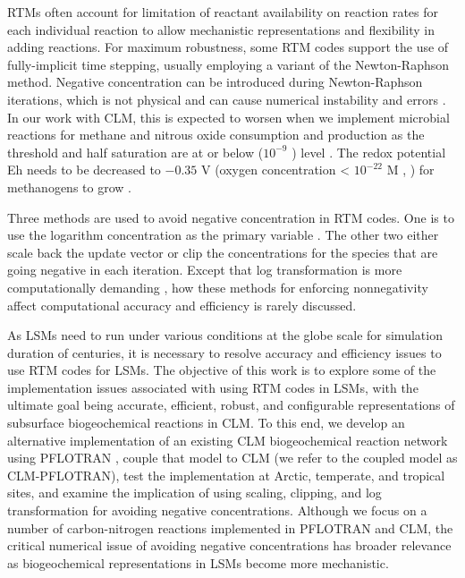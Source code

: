 \documentclass[gmd, manuscript]{copernicus}
\begin{document}
RTMs often account for limitation of reactant availability on reaction rates
for each individual reaction to allow mechanistic representations and flexibility in
adding reactions. 
For maximum robustness, some RTM codes support the use of fully-implicit time stepping, usually employing a variant of the Newton-Raphson method. 
Negative concentration can be introduced during
Newton-Raphson iterations, which is not physical and can cause numerical instability and
errors \citep{Shampine2005}. 
In our work with CLM, this is expected to worsen when we implement
microbial reactions for methane and nitrous oxide consumption and production as
the threshold and half saturation are at or below  ($10^{-9}$
) level \citep{Conrad1996}. The redox potential Eh needs to be
decreased to $-0.35$ \unit{V} (oxygen concentration < $10^{-22}$ \unit{M}
\citeauthor{Hungate1975}, \citeyear{Hungate1975}) for methanogens to grow
\citep{Jarrell1985}. 

Three methods are used to avoid negative concentration in RTM codes. One is to
use the logarithm concentration as the primary variable
\citep{Bethke2007,Hammond2003,Parkhurst1999}. The other two either scale back
the update vector \citep{Bethke2007,Hammond2003} or clip the concentrations for
the species that are going negative \citep{Yeh2004,White2005,Xu2014} in each
iteration. Except that log transformation is more computationally demanding
\citep{Hammond2003}, how these methods for enforcing nonnegativity affect
computational accuracy and efficiency is rarely discussed. 

As LSMs need to run under various conditions at the globe scale for simulation
duration of centuries, it is necessary to resolve accuracy and efficiency
issues to use RTM codes for LSMs. The objective of this work is to explore some
of the implementation issues associated with using RTM codes in LSMs, with the
ultimate goal being accurate, efficient, robust, and configurable
representations of subsurface biogeochemical reactions in CLM. To this end, we
develop an alternative implementation of an existing CLM biogeochemical
reaction network using PFLOTRAN \citep{Lichtner2015,Hammond2014}, couple that model to CLM (we refer to the coupled model as CLM-PFLOTRAN), test the
implementation at Arctic, temperate, and tropical sites, and examine the
implication of using scaling, clipping, and log transformation for avoiding
negative concentrations.  Although we focus on a number of carbon-nitrogen reactions
implemented in PFLOTRAN and CLM, the critical numerical issue of avoiding
negative concentrations has broader relevance as biogeochemical representations
in LSMs become more mechanistic. 
\end{document}
